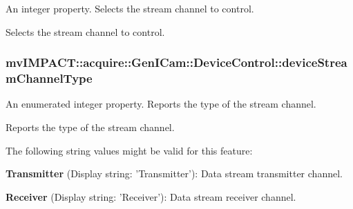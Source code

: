 An integer property. Selects the stream channel to control. 

Selects the stream channel to control. \hypertarget{classmv_i_m_p_a_c_t_1_1acquire_1_1_gen_i_cam_1_1_device_control_a61134540d9f136f68b7d927a67fa43f7}{
\subsubsection[{device\+Stream\+Channel\+Type}]{ mv\+I\+M\+P\+A\+C\+T\+::acquire\+::\+Gen\+I\+Cam\+::\+Device\+Control\+::device\+Stream\+Channel\+Type}}\label{classmv_i_m_p_a_c_t_1_1acquire_1_1_gen_i_cam_1_1_device_control_a61134540d9f136f68b7d927a67fa43f7}


An enumerated integer property. Reports the type of the stream channel. 

Reports the type of the stream channel.

The following string values might be valid for this feature\+:
\begin{DoxyItemize}
\item {\bfseries Transmitter} (Display string\+: 'Transmitter')\+: Data stream transmitter channel.
\item {\bfseries Receiver} (Display string\+: 'Receiver')\+: Data stream receiver channel.
\end{DoxyItemize}

